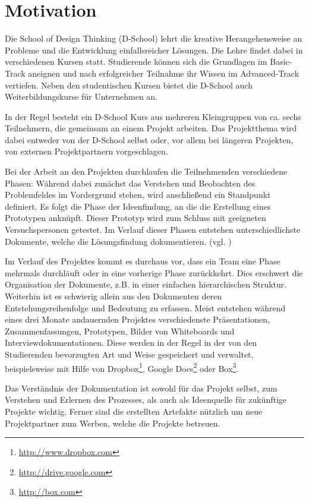 \chapter{Motivation}
\label{chap:Einleitung}
Die School of Design Thinking (D-School) lehrt die kreative Herangehensweise an Probleme und die Entwicklung einfallsreicher Lösungen. Die Lehre findet dabei in verschiedenen Kursen statt. Studierende können sich die Grundlagen im \gls{Basic-Track} aneignen und nach erfolgreicher Teilnahme ihr Wissen im  \gls{Advanced-Track} vertiefen. Neben den studentischen Kursen bietet die D-School auch Weiterbildungskurse für Unternehmen an.

In der Regel besteht ein D-School Kurs aus mehreren Kleingruppen von ca. sechs Teilnehmern, die gemeinsam an einem Projekt arbeiten. Das Projektthema wird dabei entweder von der D-School selbst oder, vor allem bei längeren Projekten, von externen Projektpartnern vorgeschlagen. 

Bei der Arbeit an den Projekten durchlaufen die Teilnehmenden verschiedene Phasen: Während dabei zunächst das Verstehen und Beobachten des Problemfeldes im Vordergrund stehen, wird anschließend ein Standpunkt definiert. Es folgt die Phase der Ideenfindung, an die die Erstellung eines Prototypen anknüpft. Dieser Prototyp wird zum Schluss mit geeigneten Versuchspersonen getestet. Im Verlauf dieser Phasen entstehen unterschiedlichste Dokumente, welche die Lösungsfindung dokumentieren. (vgl. \cite{design-thinking})

Im Verlauf des Projektes kommt es durchaus vor, dass ein Team eine Phase mehrmals durchläuft oder in eine vorherige Phase zurückkehrt. Dies erschwert die Organisation der Dokumente, z.B. in einer einfachen hierarchischen Struktur. Weiterhin ist es schwierig allein aus den Dokumenten deren Entstehungsreihenfolge und Bedeutung zu erfassen. Meist entstehen während eines drei Monate andauernden Projektes verschiedenste Präsentationen, Zusammenfassungen, Prototypen, Bilder von Whiteboards und Interviewdokumentationen. Diese werden in der Regel in der von den Studierenden bevorzugten Art und Weise gespeichert und verwaltet, beispielsweise mit Hilfe von Dropbox\footnote{\url{http://www.dropbox.com}}, Google Docs\footnote{\url{http://drive.google.com}} oder \gls{Box}\footnote{\url{http://box.com}}.

Das Verständnis der Dokumentation ist sowohl für das Projekt selbst, zum Verstehen und Erlernen des Prozesses, als auch als Ideenquelle für zukünftige Projekte wichtig. Ferner sind die erstellten Artefakte nützlich um neue Projektpartner zum Werben, welche die Projekte betreuen. 

